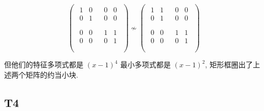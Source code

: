\documentclass{article}
\begin{document}
\begin{equation*}
	\begin{pmatrix}
		\begin{matrix}
			\boxed{1} & 0\\
			0 & \boxed{1}\\
		\end{matrix} &
		\begin{matrix}
			0 & 0\\
			0 & 0\\
		\end{matrix}\\
		\begin{matrix}
			0 & 0\\
			0 & 0\\
		\end{matrix} &
		\boxed{\begin{matrix}
				1 & 1\\
				0 & 1\\
		\end{matrix}}\\
	\end{pmatrix} \nsim
	\begin{pmatrix}
		\boxed{\begin{matrix}
				1 & 1\\
				0 & 1\\
		\end{matrix}}&
		\begin{matrix}
			0 & 0\\
			0 & 0\\
		\end{matrix}\\
		\begin{matrix}
			0 & 0\\
			0 & 0\\
		\end{matrix}&
		\boxed{\begin{matrix}
			1 & 1\\
			0 & 1\\
		\end{matrix}}\\
	\end{pmatrix}
\end{equation*}

但他们的特征多项式都是 $(x-1)^4$ 最小多项式都是 $(x-1)^2$, 矩形框圈出了上述两个矩阵的约当小块.

\subsection{T4}
\end{document}
